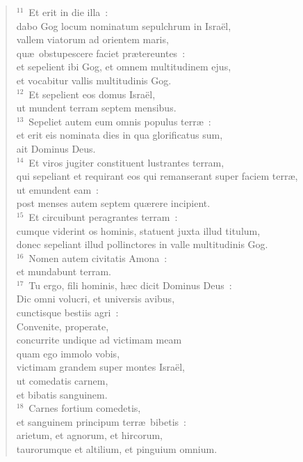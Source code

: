 \begin{flushleft}\begin{verse}${}^{11}$~Et erit in die illa~:\\ dabo Gog locum nominatum sepulchrum in Isra\"el,\\ vallem viatorum ad orientem maris,\\ qu\ae\ obstupescere faciet pr\ae tereuntes~:\\ et sepelient ibi Gog, et omnem multitudinem ejus,\\ et vocabitur vallis multitudinis Gog.\\
${}^{12}$~Et sepelient eos domus Isra\"el,\\ ut mundent terram septem mensibus.\\
${}^{13}$~Sepeliet autem eum omnis populus terr\ae~:\\ et erit eis nominata dies in qua glorificatus sum,\\ ait Dominus Deus.\\
${}^{14}$~Et viros jugiter constituent lustrantes terram,\\ qui sepeliant et requirant eos qui remanserant super faciem terr\ae ,\\ ut emundent eam~:\\ post menses autem septem qu\ae rere incipient.\\
${}^{15}$~Et circuibunt peragrantes terram~:\\ cumque viderint os hominis, statuent juxta illud titulum,\\ donec sepeliant illud pollinctores in valle multitudinis Gog.\\
${}^{16}$~Nomen autem civitatis Amona~:\\ et mundabunt terram.\\
${}^{17}$~Tu ergo, fili hominis, h\ae c dicit Dominus Deus~:\\ Dic omni volucri, et universis avibus,\\ cunctisque bestiis agri~:\\ Convenite, properate,\\ concurrite undique ad victimam meam\\ quam ego immolo vobis,\\ victimam grandem super montes Isra\"el,\\ ut comedatis carnem,\\ et bibatis sanguinem.\\
${}^{18}$~Carnes fortium comedetis,\\ et sanguinem principum terr\ae\ bibetis~:\\ arietum, et agnorum, et hircorum,\\ taurorumque et altilium, et pinguium omnium.\\

\end{verse}
\end{flushleft}
